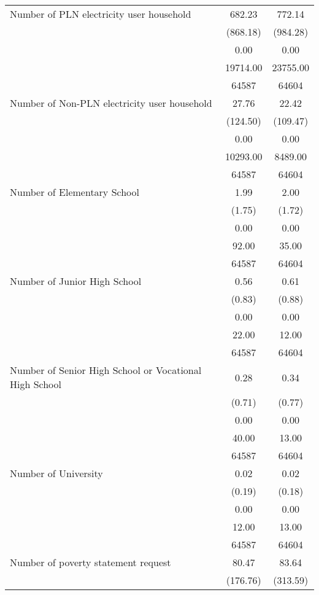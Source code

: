 \begin{tabular}{l*{2}{c}}
Number of PLN electricity user household&   682.23&   772.14\\
                & (868.18)& (984.28)\\
                &     0.00&     0.00\\
                & 19714.00& 23755.00\\
                &    64587&    64604\\
Number of Non-PLN electricity user household&    27.76&    22.42\\
                & (124.50)& (109.47)\\
                &     0.00&     0.00\\
                & 10293.00&  8489.00\\
                &    64587&    64604\\
Number of Elementary School&     1.99&     2.00\\
                &   (1.75)&   (1.72)\\
                &     0.00&     0.00\\
                &    92.00&    35.00\\
                &    64587&    64604\\
Number of Junior High School&     0.56&     0.61\\
                &   (0.83)&   (0.88)\\
                &     0.00&     0.00\\
                &    22.00&    12.00\\
                &    64587&    64604\\
Number of Senior High School or Vocational High School&     0.28&     0.34\\
                &   (0.71)&   (0.77)\\
                &     0.00&     0.00\\
                &    40.00&    13.00\\
                &    64587&    64604\\
Number of University&     0.02&     0.02\\
                &   (0.19)&   (0.18)\\
                &     0.00&     0.00\\
                &    12.00&    13.00\\
                &    64587&    64604\\
Number of poverty statement request&    80.47&    83.64\\
                & (176.76)& (313.59)\\

\end{tabular}

